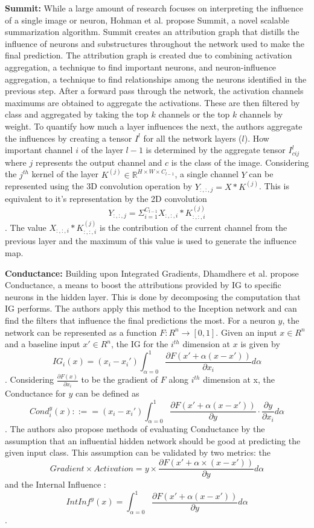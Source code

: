 \textbf{Summit: }
While a large amount of research focuses on interpreting the influence of a single image or neuron, Hohman et al. propose Summit, \cite{hohmanSummitScalingDeep2019} a novel scalable summarization algorithm. Summit creates an attribution graph that distills the influence of neurons and substructures throughout the network used to make the final prediction. The attribution graph is created due to combining activation aggregation, a technique to find important neurons, and neuron-influence aggregation, a technique to find relationships among the neurons identified in the previous step. After a forward pass through the network, the activation channels maximums are obtained to aggregate the activations. These are then filtered by class and aggregated by taking the top $k$ channels or the top $k$ channels by weight. To quantify how much a layer influences the next, the authors aggregate the influences by creating a tensor $I^{l}$ for all the network layers ($l$). How important channel $i$ of the layer $l-1$ is determined by the aggregate tensor $I^{l}_{cij}$ where $j$ represents the output channel and $c$ is the class of the image. Considering the $j^{th}$ kernel of the layer $K^{(j)} \in \mathbb{R}^{H \times W \times C_{l-1}}$, a single channel $Y$ can be represented using the 3D convolution operation by $Y_{:,:,j}= X \ast K^{(j)}$. This is equivalent to it's representation by the 2D convolution $$Y_{:,:,j}= \Sigma_{i=1}^{C_{l-1}} X_{:,:,i} \ast K^{(j)}_{:,:,i}$$. The value $X_{:,:, i} \ast K^{(j)}_{:,:, i}$ is the contribution of the current channel from the previous layer and the maximum of this value is used to generate the influence map.

\textbf{Conductance: }
Building upon Integrated Gradients, Dhamdhere et al. propose \cite{dhamdhereHowImportantNeuron2018} Conductance, a means to boost the attributions provided by IG to specific neurons in the hidden layer. This is done by decomposing the computation that IG performs. The authors apply this method to the Inception network \cite{szegedyGoingDeeperConvolutions2014} and can find the filters that influence the final predictions the most. 
For a neuron $y$, the network can be represented as a function $F: R^{n} \rightarrow [0,1]$. Given an input $x \in R^{n}$ and a baseline input $x' \in R^{n}$, the IG for the $i^{th}$ dimension at $x$ is given by $$IG_{i}(x) = (x_{i}- x_{i}') \int_{\alpha=0}^{1} \frac{\partial F(x' + \alpha(x-x'))}{\partial x_{i}}d \alpha$$ . Considering $\frac{\partial F(x)}{\partial x_{i}}$ to be the gradient of $F$ along $i^{th}$ dimension at x, the Conductance for $y$ can be defined as $$
Cond_{i}^{y}(x) ::== (x_{i}- x_{i}') \int_{\alpha=0}^{1} \frac{\partial F(x' + \alpha(x-x'))}{\partial y} \cdot \frac{\partial y}{\partial x_{i}} d \alpha$$. The authors also propose methods of evaluating Conductance by the assumption that an influential hidden network should be good at predicting the given input class. This assumption can be validated by two metrics: the $$Gradient\times Activation = 
y \times \frac{\partial F(x' + \alpha \times (x-x'))}{\partial y} d \alpha$$ and the Internal Influence : $$
IntInf ^{y}(x) = \int^{1}_{\alpha=0} \frac{\partial F(x' + \alpha(x-x'))}{\partial y} d \alpha$$.\\

